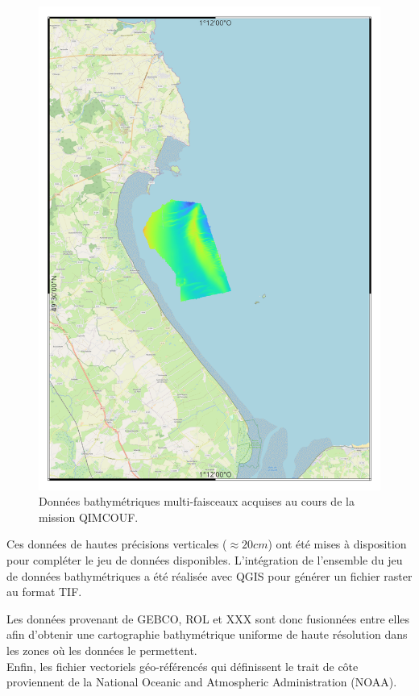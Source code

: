 \documentclass[10pt,a4paper,titlepage]{article}
\begin{document}
\begin{figure}[H]
    \centering
    \includegraphics[scale=0.35]{../images/QIMCOUF.png}
    \caption{Données bathymétriques multi-faisceaux acquises au cours de la mission QIMCOUF.}
    \label{fig:QIMCOUF}
\end{figure}

Ces données de hautes précisions verticales ($\approx 20 cm$) ont été mises à disposition pour compléter le jeu de données disponibles.
L'intégration de l'ensemble du jeu de données bathymétriques a été réalisée avec QGIS pour générer un fichier raster au format TIF.


Les données provenant de GEBCO, ROL et XXX sont donc fusionnées entre elles afin d'obtenir une cartographie bathymétrique uniforme de haute résolution dans les zones où les données le permettent.
\\
Enfin, les fichier vectoriels géo-référencés qui définissent le trait de côte proviennent de la National Oceanic and Atmospheric Administration (NOAA).
\end{document}
